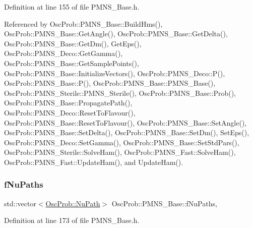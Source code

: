 Definition at line 155 of file P\+M\+N\+S\+\_\+\+Base.\+h.



Referenced by Osc\+Prob\+::\+P\+M\+N\+S\+\_\+\+Base\+::\+Build\+Hms(), Osc\+Prob\+::\+P\+M\+N\+S\+\_\+\+Base\+::\+Get\+Angle(), Osc\+Prob\+::\+P\+M\+N\+S\+\_\+\+Base\+::\+Get\+Delta(), Osc\+Prob\+::\+P\+M\+N\+S\+\_\+\+Base\+::\+Get\+Dm(), Get\+Eps(), Osc\+Prob\+::\+P\+M\+N\+S\+\_\+\+Deco\+::\+Get\+Gamma(), Osc\+Prob\+::\+P\+M\+N\+S\+\_\+\+Base\+::\+Get\+Sample\+Points(), Osc\+Prob\+::\+P\+M\+N\+S\+\_\+\+Base\+::\+Initialize\+Vectors(), Osc\+Prob\+::\+P\+M\+N\+S\+\_\+\+Deco\+::\+P(), Osc\+Prob\+::\+P\+M\+N\+S\+\_\+\+Base\+::\+P(), Osc\+Prob\+::\+P\+M\+N\+S\+\_\+\+Base\+::\+P\+M\+N\+S\+\_\+\+Base(), Osc\+Prob\+::\+P\+M\+N\+S\+\_\+\+Sterile\+::\+P\+M\+N\+S\+\_\+\+Sterile(), Osc\+Prob\+::\+P\+M\+N\+S\+\_\+\+Base\+::\+Prob(), Osc\+Prob\+::\+P\+M\+N\+S\+\_\+\+Base\+::\+Propagate\+Path(), Osc\+Prob\+::\+P\+M\+N\+S\+\_\+\+Deco\+::\+Reset\+To\+Flavour(), Osc\+Prob\+::\+P\+M\+N\+S\+\_\+\+Base\+::\+Reset\+To\+Flavour(), Osc\+Prob\+::\+P\+M\+N\+S\+\_\+\+Base\+::\+Set\+Angle(), Osc\+Prob\+::\+P\+M\+N\+S\+\_\+\+Base\+::\+Set\+Delta(), Osc\+Prob\+::\+P\+M\+N\+S\+\_\+\+Base\+::\+Set\+Dm(), Set\+Eps(), Osc\+Prob\+::\+P\+M\+N\+S\+\_\+\+Deco\+::\+Set\+Gamma(), Osc\+Prob\+::\+P\+M\+N\+S\+\_\+\+Base\+::\+Set\+Std\+Pars(), Osc\+Prob\+::\+P\+M\+N\+S\+\_\+\+Sterile\+::\+Solve\+Ham(), Osc\+Prob\+::\+P\+M\+N\+S\+\_\+\+Fast\+::\+Solve\+Ham(), Osc\+Prob\+::\+P\+M\+N\+S\+\_\+\+Fast\+::\+Update\+Ham(), and Update\+Ham().

\mbox{\label{classOscProb_1_1PMNS__Base_a69db9d57e12fc7cbe0431bc6c18fac93}} 
\subsubsection{\texorpdfstring{f\+Nu\+Paths}{fNuPaths}}
{\footnotesize\ttfamily std\+::vector$<$\hyperlink{structOscProb_1_1NuPath}{Osc\+Prob\+::\+Nu\+Path}$>$ Osc\+Prob\+::\+P\+M\+N\+S\+\_\+\+Base\+::f\+Nu\+Paths\hspace{0.3cm}{\ttfamily [protected]}, {\ttfamily [inherited]}}



Definition at line 173 of file P\+M\+N\+S\+\_\+\+Base.\+h.




